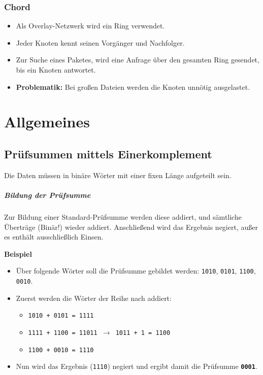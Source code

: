             \subsection{Chord}
                \begin{itemize}
                	\item Als Overlay-Netzwerk wird ein Ring verwendet.
                	\item Jeder Knoten kennt seinen Vorgänger und Nachfolger.
                	\item Zur Suche eines Paketes, wird eine Anfrage über den gesamten Ring gesendet, bis ein Knoten antwortet.
                	\item \textbf{Problematik:} Bei großen Dateien werden die Knoten unnötig ausgelastet.
                \end{itemize}

\chapter{Allgemeines}
	\section{Prüfsummen mittels Einerkomplement}
		\label{sec:checksumonescomplement}
	
		Die Daten müssen in binäre Wörter mit einer fixen Länge aufgeteilt sein.
		
		\paragraph{Bildung der Prüfsumme}
			Zur Bildung einer Standard-Prüfsumme werden diese addiert, und sämtliche Überträge (Binär!) wieder addiert. Anschließend wird das Ergebnis negiert, außer es enthält ausschließlich Einsen.
			
			\textbf{Beispiel}
			\begin{itemize}
				\item Über folgende Wörter soll die Prüfsumme gebildet werden: \texttt{1010}, \texttt{0101}, \texttt{1100}, \texttt{0010}.
				\item Zuerst werden die Wörter der Reihe nach addiert:
					\begin{itemize}
						\item \texttt{1010 + 0101 = 1111}
						\item \texttt{1111 + 1100 = 11011 \(\rightarrow\) 1011 + 1 = 1100}
						\item \texttt{1100 + 0010 = 1110}
					\end{itemize}
				\item Nun wird das Ergebnis (\texttt{1110}) negiert und ergibt damit die Prüfsumme \textbf{\texttt{0001}}.
			\end{itemize}
		
